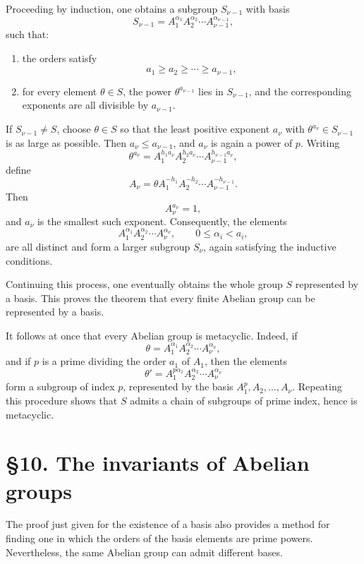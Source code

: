 \documentclass[11pt]{article}
\begin{document}
Proceeding by induction, one obtains a subgroup \(S_{\nu-1}\) with basis
\[
S_{\nu-1}=A_1^{\alpha_1}A_2^{\alpha_2}\cdots A_{\nu-1}^{\alpha_{\nu-1}},
\tag{16}
\]
such that:
\begin{enumerate}
\item the orders satisfy
\[
a_1\geq a_2\geq \cdots\geq a_{\nu-1},
\]
\item for every element \(\theta\in S\), the power \(\theta^{a_{\nu-1}}\) lies in \(S_{\nu-1}\), and the corresponding exponents are all divisible by \(a_{\nu-1}\).
\end{enumerate}

If \(S_{\nu-1}\neq S\), choose \(\theta\in S\) so that the least positive exponent \(a_\nu\) with \(\theta^{a_\nu}\in S_{\nu-1}\) is as large as possible. Then \(a_\nu\leq a_{\nu-1}\), and \(a_\nu\) is again a power of \(p\). Writing
\[
\theta^{a_\nu}=A_1^{h_1a_\nu}A_2^{h_2a_\nu}\cdots A_{\nu-1}^{h_{\nu-1}a_\nu},
\tag{17}
\]
define
\[
A_\nu=\theta A_1^{-h_1}A_2^{-h_2}\cdots A_{\nu-1}^{-h_{\nu-1}}.
\tag{18}
\]
Then
\[
A_\nu^{a_\nu}=1,
\tag{19}
\]
and \(a_\nu\) is the smallest such exponent. Consequently, the elements
\[
A_1^{\alpha_1}A_2^{\alpha_2}\cdots A_\nu^{\alpha_\nu},
\qquad
0\leq \alpha_i<a_i,
\tag{20}
\]
are all distinct and form a larger subgroup \(S_\nu\), again satisfying the inductive conditions.

Continuing this process, one eventually obtains the whole group \(S\) represented by a basis. This proves the theorem that every finite Abelian group can be represented by a basis.

It follows at once that every Abelian group is metacyclic. Indeed, if
\[
\theta=A_1^{\alpha_1}A_2^{\alpha_2}\cdots A_\nu^{\alpha_\nu},
\]
and if \(p\) is a prime dividing the order \(a_1\) of \(A_1\), then the elements
\[
\theta'=A_1^{p\alpha_1}A_2^{\alpha_2}\cdots A_\nu^{\alpha_\nu}
\]
form a subgroup of index \(p\), represented by the basis \(A_1^p,A_2,\dots,A_\nu\). Repeating this procedure shows that \(S\) admits a chain of subgroups of prime index, hence is metacyclic.

\section*{\S 10. The invariants of Abelian groups}

The proof just given for the existence of a basis also provides a method for finding one in which the orders of the basis elements are prime powers. Nevertheless, the same Abelian group can admit different bases.
\end{document}
